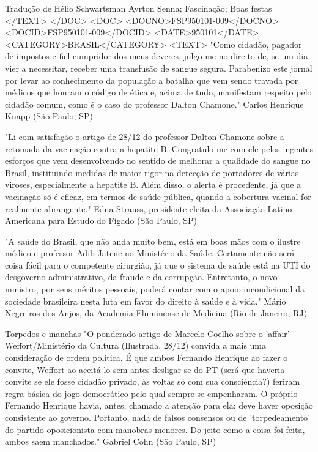 Tradução de Hélio Schwartsman
Ayrton Senna; Fascinação; Boas festas
</TEXT>
</DOC>
<DOC>
<DOCNO>FSP950101-009</DOCNO>
<DOCID>FSP950101-009</DOCID>
<DATE>950101</DATE>
<CATEGORY>BRASIL</CATEGORY>
<TEXT>
"Como cidadão, pagador de impostos e fiel cumpridor dos meus deveres, julgo-me no direito de, se um dia vier a necessitar, receber uma transfusão de sangue segura. Parabenizo este jornal por levar ao conhecimento da população a batalha que vem sendo travada por médicos que honram o código de ética e, acima de tudo, manifestam respeito pelo cidadão comum, como é o caso do professor Dalton Chamone."
Carlos Henrique Knapp (São Paulo, SP)
 
"Li com satisfação o artigo de 28/12 do professor Dalton Chamone sobre a retomada da vacinação contra a hepatite B. Congratulo-me com ele pelos ingentes esforços que vem desenvolvendo no sentido de melhorar a qualidade do sangue no Brasil, instituindo medidas de maior rigor na detecção de portadores de várias viroses, especialmente a hepatite B. Além disso, o alerta é procedente, já que a vacinação só é eficaz, em termos de saúde pública, quando a cobertura vacinal for realmente abrangente."
Edna Strauss, presidente eleita da Associação Latino-Americana para Estudo do Fígado (São Paulo, SP)
 
"A saúde do Brasil, que não anda muito bem, está em boas mãos com o ilustre médico e professor Adib Jatene no Ministério da Saúde. Certamente não será coisa fácil para o competente cirurgião, já que o sistema de saúde está na UTI do desgoverno administrativo, da fraude e da corrupção. Entretanto, o novo ministro, por seus méritos pessoais, poderá contar com o apoio incondicional da sociedade brasileira nesta luta em favor do direito à saúde e à vida."
Mário Negreiros dos Anjos, da Academia Fluminense de Medicina (Rio de Janeiro, RJ)

Torpedos e manchas
"O ponderado artigo de Marcelo Coelho sobre o 'affair' Weffort/Ministério da Cultura (Ilustrada, 28/12) convida a mais uma consideração de ordem política. É que ambos Fernando Henrique ao fazer o convite, Weffort ao aceitá-lo sem antes desligar-se do PT (será que haveria convite se ele fosse cidadão privado, às voltas só com sua consciência?) feriram regra básica do jogo democrático pelo qual sempre se empenharam. O próprio Fernando Henrique havia, antes, chamado a atenção para ela: deve haver oposição consistente ao governo. Portanto, nada de falsos consensos ou de 'torpedeamento' do partido oposicionista com manobras menores. Do jeito como a coisa foi feita, ambos saem manchados."
Gabriel Cohn (São Paulo, SP)
 
